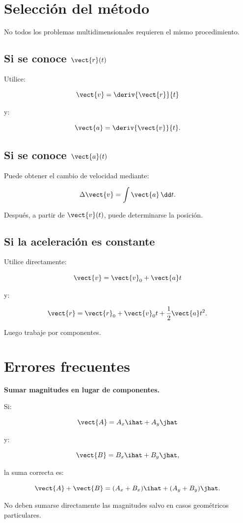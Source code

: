 \section{Selección del método}

No todos los problemas multidimensionales requieren el mismo procedimiento.

\subsection{Si se conoce \texorpdfstring{\(\vect{r}(t)\)}{r(t)}}

Utilice:

\[
\vect{v}
=
\deriv{\vect{r}}{t}
\]

y:

\[
\vect{a}
=
\deriv{\vect{v}}{t}.
\]


\subsection{Si se conoce \texorpdfstring{\(\vect{a}(t)\)}{a(t)}}

Puede obtener el cambio de velocidad mediante:

\[
\Delta\vect{v}
=
\int\vect{a}\,\dd t.
\]

Después, a partir de \(\vect{v}(t)\), puede determinarse la posición.


\subsection{Si la aceleración es constante}

Utilice directamente:

\[
\vect{v}
=
\vect{v}_0+\vect{a}t
\]

y:

\[
\vect{r}
=
\vect{r}_0
+
\vect{v}_0t
+
\frac{1}{2}\vect{a}t^2.
\]

Luego trabaje por componentes.


\section{Errores frecuentes}

\begin{errorfrecuente}
\textbf{Sumar magnitudes en lugar de componentes.}

Si:

\[
\vect{A}=A_x\ihat+A_y\jhat
\]

y:

\[
\vect{B}=B_x\ihat+B_y\jhat,
\]

la suma correcta es:

\[
\vect{A}+\vect{B}
=
(A_x+B_x)\ihat
+
(A_y+B_y)\jhat.
\]

No deben sumarse directamente las magnitudes salvo en casos geométricos
particulares.
\end{errorfrecuente}


